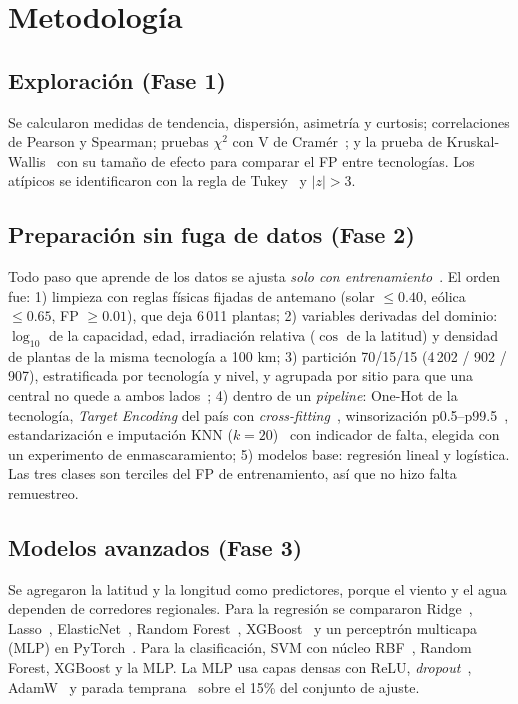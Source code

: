 \documentclass[journal,letterpaper]{IEEEtran}
\begin{document}
\section{Metodología}
\subsection{Exploración (Fase 1)}
Se calcularon medidas de tendencia, dispersión, asimetría y curtosis; correlaciones de Pearson y Spearman; pruebas $\chi^2$ con V de Cramér~\cite{cramer1946}; y la prueba de Kruskal-Wallis~\cite{kruskal1952} con su tamaño de efecto para comparar el FP entre tecnologías. Los atípicos se identificaron con la regla de Tukey~\cite{tukey1977} y $|z| > 3$.

\subsection{Preparación sin fuga de datos (Fase 2)}
Todo paso que aprende de los datos se ajusta \emph{solo con entrenamiento}~\cite{kaufman2012}. El orden fue: 1) limpieza con reglas físicas fijadas de antemano (solar $\leq 0.40$, eólica $\leq 0.65$, FP $\geq 0.01$), que deja 6\,011 plantas; 2) variables derivadas del dominio: $\log_{10}$ de la capacidad, edad, irradiación relativa ($\cos$ de la latitud) y densidad de plantas de la misma tecnología a 100 km; 3) partición 70/15/15 (4\,202 / 902 / 907), estratificada por tecnología y nivel, y agrupada por sitio para que una central no quede a ambos lados~\cite{roberts2017}; 4) dentro de un \textit{pipeline}: One-Hot de la tecnología, \textit{Target Encoding} del país con \textit{cross-fitting}~\cite{microbarreca2001}, winsorización p0.5--p99.5~\cite{dixon1960}, estandarización e imputación KNN ($k = 20$)~\cite{troyanskaya2001} con indicador de falta, elegida con un experimento de enmascaramiento; 5) modelos base: regresión lineal y logística. Las tres clases son terciles del FP de entrenamiento, así que no hizo falta remuestreo.

\subsection{Modelos avanzados (Fase 3)}
Se agregaron la latitud y la longitud como predictores, porque el viento y el agua dependen de corredores regionales. Para la regresión se compararon Ridge~\cite{hoerl1970}, Lasso~\cite{tibshirani1996}, ElasticNet~\cite{zou2005}, Random Forest~\cite{breiman2001}, XGBoost~\cite{chen2016} y un perceptrón multicapa (MLP) en PyTorch~\cite{paszke2019}. Para la clasificación, SVM con núcleo RBF~\cite{cortes1995}, Random Forest, XGBoost y la MLP. La MLP usa capas densas con ReLU, \textit{dropout}~\cite{srivastava2014}, AdamW~\cite{loshchilov2019} y parada temprana~\cite{prechelt1998} sobre el 15\% del conjunto de ajuste.
\end{document}
